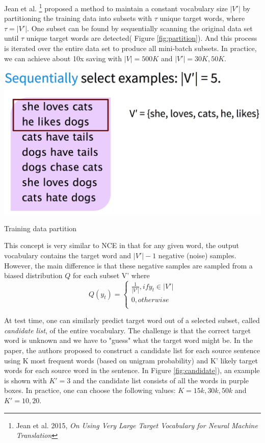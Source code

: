 \documentclass{tufte-handout}
\begin{document}
Jean et al. \footnote{Jean et al. 2015, \textit{On Using Very
Large Target Vocabulary for Neural Machine Translation}} proposed a method to maintain a constant vocabulary size $|V'|$ by partitioning the training data into subsets with $\tau$ unique target words, where $\tau=|V'|$. One subset can be found by sequentially scanning the original data set until $\tau$ unique target words are detected( Figure \ref{fig:partition}). And this process is iterated over the entire data set to produce all mini-batch subsets. In practice, we can achieve about 10x saving with $|V|=500K$ and $|V'|=30K, 50K$.

\begin{marginfigure}
	\centering
	\includegraphics[width=0.9\linewidth]{partition.png}
	\caption {Training data partition}
	\label{fig:partition}
\end{marginfigure}

This concept is very similar to NCE in that for any given word, the output vocabulary contains the target word and $|V'|-1$ negative (noise) samples. However, the main difference is that these negative samples are sampled from a biased distribution $Q$ for each subset V' where 
\[
  Q(y_t)=\begin{cases}
               \frac{1}{|V'|}, if y_t \in |V'|\\ 
               0, otherwise\\
            \end{cases}
\]

At test time, one can similarly predict target word out of a selected subset, called \textit{candidate list}, of the entire vocabulary. The challenge is that the correct target word is unknown and we have to "guess" what the target word might be. In the paper, the authors proposed to construct a candidate list for each source sentence using K most frequent words (based on unigram probability) and K' likely target words for each source word in the sentence. In Figure \ref{fig:candidate}), an example is shown with $K'=3$ and the candidate list consists of all the words in purple boxes. In practice, one can choose the following values: $K =15k,30k,50k$ and $K' = 10, 20$.
\end{document}

